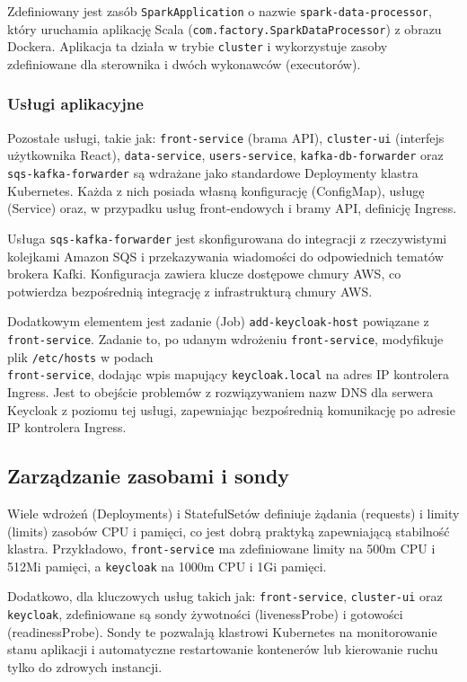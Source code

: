 Zdefiniowany jest zasób \texttt{SparkApplication} o nazwie \texttt{spark-data-processor}, który uruchamia aplikację Scala (\texttt{com.factory.SparkDataProcessor}) z obrazu Dockera. Aplikacja ta działa w trybie \texttt{cluster} i wykorzystuje zasoby zdefiniowane dla sterownika i dwóch wykonawców (executorów).

\subsubsection{Usługi aplikacyjne}
Pozostałe usługi, takie jak: \texttt{front-service} (brama API), \texttt{cluster-ui} (interfejs użytkownika React), \texttt{data-service}, \texttt{users-service}, \texttt{kafka-db-forwarder} oraz \texttt{sqs-kafka-forwarder} są wdrażane jako standardowe Deploymenty klastra Kubernetes. Każda z nich posiada własną konfigurację (ConfigMap), usługę (Service) oraz, w przypadku usług front-endowych i bramy API, definicję Ingress.

Usługa \texttt{sqs-kafka-forwarder} jest skonfigurowana do integracji z rzeczywistymi kolejkami Amazon SQS i przekazywania wiadomości do odpowiednich tematów brokera Kafki. Konfiguracja zawiera klucze dostępowe chmury AWS, co potwierdza bezpośrednią integrację z infrastrukturą chmury AWS.

Dodatkowym elementem jest zadanie (Job) \texttt{add-keycloak-host} powiązane z \texttt{front-service}. Zadanie to, po udanym wdrożeniu \texttt{front-service}, modyfikuje plik \texttt{/etc/hosts} w podach \\ \texttt{front-service}, dodając wpis mapujący \texttt{keycloak.local} na adres IP kontrolera Ingress. Jest to obejście problemów z rozwiązywaniem nazw DNS dla serwera Keycloak z poziomu tej usługi, zapewniając bezpośrednią komunikację po adresie IP kontrolera Ingress.

\subsection{Zarządzanie zasobami i sondy}
\label{sub:zasoby_sondy}
Wiele wdrożeń (Deployments) i StatefulSetów definiuje żądania (requests) i limity (limits) zasobów CPU i pamięci, co jest dobrą praktyką zapewniającą stabilność klastra. Przykładowo, \texttt{front-service} ma zdefiniowane limity na 500m CPU i 512Mi pamięci, a \texttt{keycloak} na 1000m CPU i 1Gi pamięci.

Dodatkowo, dla kluczowych usług takich jak: \texttt{front-service}, \texttt{cluster-ui} oraz \texttt{keycloak}, zdefiniowane są sondy żywotności (livenessProbe) i gotowości (readinessProbe). Sondy te pozwalają klastrowi Kubernetes na monitorowanie stanu aplikacji i automatyczne restartowanie kontenerów lub kierowanie ruchu tylko do zdrowych instancji.
